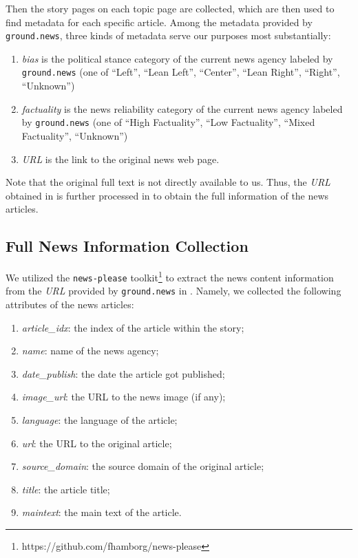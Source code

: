 Then the story pages on each topic page are collected, which are then used to find metadata for each specific article. 
Among the metadata provided by \texttt{ground.news}, three kinds of metadata serve our purposes most substantially:
\begin{enumerate}
    \item \textit{bias} is the political stance category of the current news agency labeled by \texttt{ground.news} (one of ``Left'', ``Lean Left'', ``Center'', ``Lean Right'', ``Right'', ``Unknown'')
    \item \textit{factuality} is the news reliability category of the current news agency labeled by \texttt{ground.news} (one of ``High Factuality'', ``Low Factuality'', ``Mixed Factuality'', ``Unknown'')
    \item \textit{URL} is the link to the original news web page.
\end{enumerate}

Note that the original full text is not directly available to us. Thus, the \textit{URL} obtained in  is further processed in  to obtain the full information of the news articles.


\subsection{Full News Information Collection}
\label{full-news}
We utilized the \texttt{news-please} toolkit\footnote{https://github.com/fhamborg/news-please} to extract the news content information from the \textit{URL} provided by \texttt{ground.news} in . Namely, we collected the following attributes of the news articles:
\begin{enumerate}
    \item \textit{article\_idx}: the index of the article within the story;
    \item \textit{name}: name of the news agency;
    \item \textit{date\_publish}: the date the article got published;
    \item \textit{image\_url}: the URL to the news image (if any);
    \item \textit{language}: the language of the article;
    \item \textit{url}: the URL to the original article;
    \item \textit{source\_domain}: the source domain of the original article;
    \item \textit{title}: the article title;
    \item \textit{maintext}: the main text of the article.
\end{enumerate}

